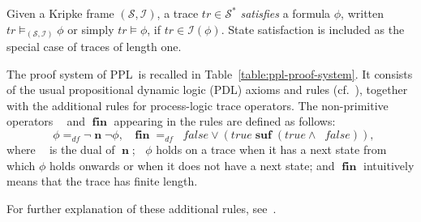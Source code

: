 \documentclass[manuscript,screen]{acmart}
\newcommand{\mcl}[1]{\mathcal{#1}}
\newcommand{\dddef}[0]{=_{df}}
\newcommand{\true}[0]{\mathit{true}}
\newcommand{\false}[0]{\mathit{false}}
\newcommand{\Wd}[0]{\mcl{S}}
\newcommand{\I}[0]{\mcl{I}}
\DeclareMathOperator{\osuf}{\mathbf{suf}}
\DeclareMathOperator{\nxt}{\mathbf{n}}
\newcommand{\PPL}[0]{\mbox{PPL}}
\DeclareMathOperator{\bnxt}{\bar{\nxt}}
\DeclareMathOperator{\fin}{\mathbf{fin}}
\begin{document}
Given a Kripke frame $(\Wd,\I)$, a trace $tr\in\Wd^*$ \emph{satisfies} a formula $\phi$, written $tr\models_{(\Wd,\I)}\phi$ or simply $tr\models\phi$, if $tr\in\I(\phi)$.  State satisfaction is included as the special case of traces of length one.

The proof system of \PPL\ is recalled in Table~\ref{table:ppl-proof-system}.  It consists of the usual propositional dynamic logic (PDL) axioms and rules (cf.~\cite{Harel00}), together with the additional rules for process-logic trace operators.
The non-primitive operators $\bnxt$ and $\fin$ appearing in the rules are defined as follows:
$$
\bnxt \phi\dddef \neg\nxt\neg\phi, \mbox{ }\fin \dddef \bnxt \false \vee (\true\osuf(\true\wedge\bnxt \false)), 
$$
where $\bnxt$ is the dual of $\nxt$; $\bnxt\phi$ holds on a trace when it has a next state from which $\phi$ holds onwards or when it does not have a next state; and $\fin$ intuitively means that the trace has finite length. 


For further explanation of these additional rules, see~\cite{Harel82}.
\end{document}
